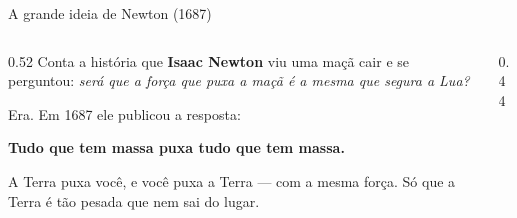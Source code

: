 \documentclass[aspectratio=169,11pt]{beamer}
\newcommand{\bnum}[1]{\textbf{\textcolor{mTeal}{#1}}}
\begin{document}
\begin{frame}{A grande ideia de Newton (1687)}
  \begin{columns}[T]
    \begin{column}{0.52\textwidth}
      Conta a história que \textbf{Isaac Newton} viu uma maçã cair e se perguntou: \emph{será
      que a força que puxa a maçã é a mesma que segura a Lua?}
      \medskip

      Era. Em 1687 ele publicou a resposta:
      \medskip
      \begin{ideia}
        \centering \bnum{Tudo que tem massa puxa tudo que tem massa.}
      \end{ideia}
      \medskip

      A Terra puxa você, e você puxa a Terra --- \alert{com a mesma força}. Só que a Terra é
      tão pesada que nem sai do lugar.
    \end{column}
    \begin{column}{0.44\textwidth}
      \centering
    \end{column}
  \end{columns}
\end{frame}
\end{document}
